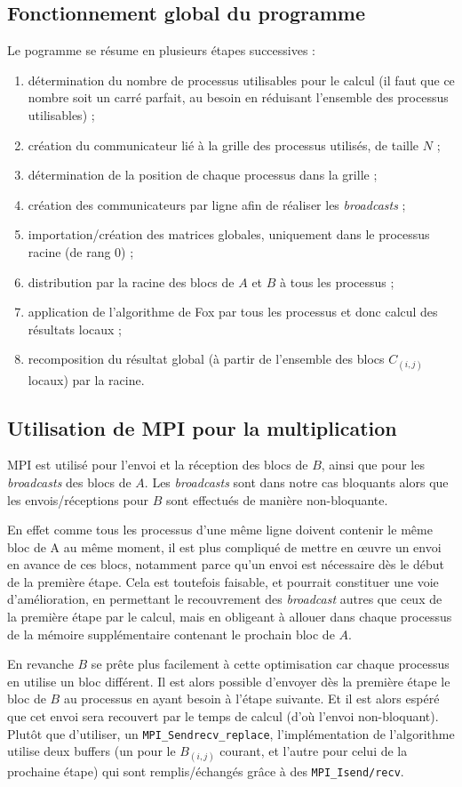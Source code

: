 \subsection{Fonctionnement global du programme}

Le pogramme se résume en plusieurs étapes successives :
\begin{enumerate}
\item détermination du nombre de processus utilisables pour le calcul (il faut que ce nombre soit un carré parfait, au besoin en réduisant l'ensemble des processus utilisables) ;
\item création du communicateur lié à la grille des processus utilisés, de taille $N$ ;
\item détermination de la position de chaque processus dans la grille ;
\item création des communicateurs par ligne afin de réaliser les \emph{broadcasts} ;
\item importation/création des matrices globales, uniquement dans le processus racine (de rang $0$) ;
\item distribution par la racine des blocs de $A$ et $B$ à tous les processus ;
\item application de l'algorithme de Fox par tous les processus et donc calcul des résultats locaux ;
\item recomposition du résultat global (à partir de l'ensemble des blocs $C_{(i,j)}$ locaux) par la racine.
\end{enumerate}

\subsection{Utilisation de MPI pour la multiplication}

MPI est utilisé pour l'envoi et la réception des blocs de $B$, ainsi que pour les \emph{broadcasts} des blocs de $A$. Les \emph{broadcasts} sont dans notre cas bloquants alors que les envois/réceptions pour $B$ sont effectués de manière non-bloquante. 

En effet comme tous les processus d'une même ligne doivent contenir le même bloc de A au même moment, il est plus compliqué de mettre en \oe uvre un envoi en avance de ces blocs, notamment parce qu'un envoi est nécessaire dès le début de la première étape. Cela est toutefois faisable, et pourrait constituer une voie d'amélioration, en permettant le recouvrement des \emph{broadcast} autres que ceux de la première étape par le calcul, mais en obligeant à allouer dans chaque processus de la mémoire supplémentaire contenant le prochain bloc de $A$. 

En revanche $B$ se prête plus facilement à cette optimisation car chaque processus en utilise un bloc différent. Il est alors possible d'envoyer dès la première étape le bloc de $B$ au processus en ayant besoin à l'étape suivante. Et il est alors espéré que cet envoi sera recouvert par le temps de calcul (d'où l'envoi non-bloquant). Plutôt que d'utiliser, un \texttt{MPI\_Sendrecv\_replace}, l'implémentation de l'algorithme utilise deux buffers (un pour le $B_{(i,j)}$ courant, et l'autre pour celui de la prochaine étape) qui sont remplis/échangés grâce à des \texttt{MPI\_Isend/recv}.
